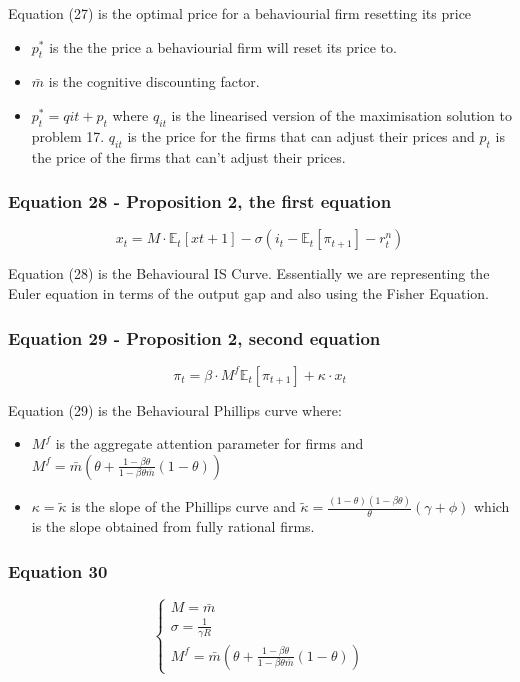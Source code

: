 \documentclass{article}
\begin{document}
Equation (27) is the optimal price for a behaviourial firm resetting its price
\begin{itemize}
    \item $p^{*}_{t}$ is the the price a behaviourial firm will reset its price to. 
    \item $\bar{m}$ is the cognitive discounting factor. 
    \item $p^{*}_{t}= q{it}+p_{t}$ where $q_{it}$ is the linearised version of the maximisation solution to problem 17. $q_{it}$ is the price for the firms that can adjust their prices and $p_{t}$ is the price of the firms that can't adjust their prices.
\end{itemize}

\subsubsection*{Equation 28 - Proposition 2, the first equation}
\begin{equation}
    x_{t}=M\cdot\mathbb{E}_{t}\left[x{t+1}\right]-\sigma(i_{t}-\mathbb{E}_{t}\left[\pi_{t+1}\right]-r^{n}_{t})
\end{equation}

Equation (28) is the Behavioural IS Curve. Essentially we are representing the Euler equation in terms of the output gap and also using the Fisher Equation.

\subsubsection*{Equation 29 - Proposition 2, second equation}
\begin{equation}
    \pi_{t}=\beta\cdot M^{f} \mathbb{E}_{t}\left[\pi_{t+1}\right]+\kappa\cdot x_{t}
\end{equation}

Equation (29) is the Behavioural Phillips curve where: 
\begin{itemize}
    \item $M^{f}$ is the aggregate attention parameter for firms and $M^{f}=\bar{m}\left(\theta+\frac{1-\beta\theta}{1-\beta\theta\bar{m}}(1-\theta)\right)$
    \item $\kappa=\widetilde{\kappa}$  is the slope of the Phillips curve and $\widetilde{\kappa} =  \frac{(1-\theta)(1-\beta\theta)}{\theta}(\gamma+\phi)$ which is the slope obtained from fully rational firms. 

\end{itemize}

\subsubsection*{Equation 30}
\begin{equation}
    \begin{cases}
        M=\bar{m} \\
        \sigma=\frac{1}{\gamma R} \\
        M^{f}=\bar{m}\left(\theta+\frac{1-\beta\theta}{1-\beta\theta\bar{m}}(1-\theta)\right)
    \end{cases}
\end{equation}
\end{document}
